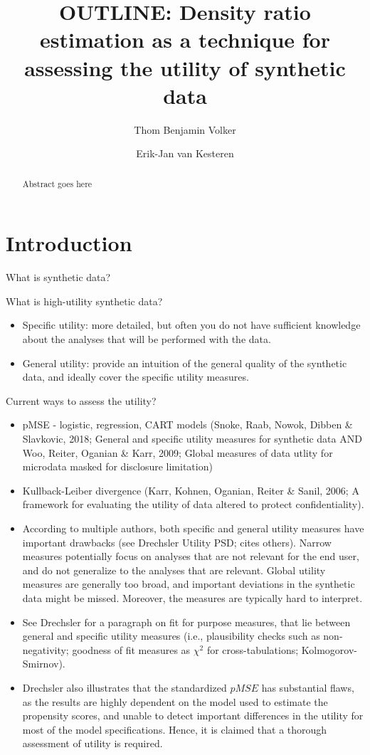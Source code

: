 \documentclass{statsoc}
\title[Density ratio estimation for synthetic data]{OUTLINE: Density
ratio estimation as a technique for assessing the utility of synthetic
data}
\author[Volker \& Van Kesteren]{Thom Benjamin Volker}
\author[Volker \& Van Kesteren]{Erik-Jan van Kesteren}
\begin{document}
\begin{abstract}
Abstract goes here
\end{abstract}

\hypertarget{introduction}{%
\section{Introduction}\label{introduction}}

What is synthetic data?

What is high-utility synthetic data?

\begin{itemize}
\item
  Specific utility: more detailed, but often you do not have sufficient
  knowledge about the analyses that will be performed with the data.
\item
  General utility: provide an intuition of the general quality of the
  synthetic data, and ideally cover the specific utility measures.
\end{itemize}

Current ways to assess the utility?

\begin{itemize}
\item
  pMSE - logistic, regression, CART models (Snoke, Raab, Nowok, Dibben
  \& Slavkovic, 2018; General and specific utility measures for
  synthetic data AND Woo, Reiter, Oganian \& Karr, 2009; Global measures
  of data utlity for microdata masked for disclosure limitation)
\item
  Kullback-Leiber divergence (Karr, Kohnen, Oganian, Reiter \& Sanil,
  2006; A framework for evaluating the utility of data altered to
  protect confidentiality).
\item
  According to multiple authors, both specific and general utility
  measures have important drawbacks (see Drechsler Utility PSD; cites
  others). Narrow measures potentially focus on analyses that are not
  relevant for the end user, and do not generalize to the analyses that
  are relevant. Global utility measures are generally too broad, and
  important deviations in the synthetic data might be missed. Moreover,
  the measures are typically hard to interpret.
\item
  See Drechsler for a paragraph on fit for purpose measures, that lie
  between general and specific utility measures (i.e., plausibility
  checks such as non-negativity; goodness of fit measures as \(\chi^2\)
  for cross-tabulations; Kolmogorov-Smirnov).
\item
  Drechsler also illustrates that the standardized \(pMSE\) has
  substantial flaws, as the results are highly dependent on the model
  used to estimate the propensity scores, and unable to detect important
  differences in the utility for most of the model specifications.
  Hence, it is claimed that a thorough assessment of utility is
  required.
\end{itemize}
\end{document}
